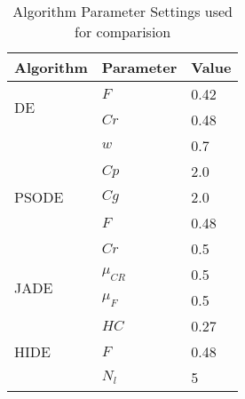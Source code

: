 

\begin{table}[b]
\centering
\caption{Algorithm Parameter Settings used for comparision}
\label{}
\begin{tabular}{|l|l|l|}
\hline
Algorithm & Parameter & Value \\
\hline
\multirow{2}{*}{DE} & $F$ & 0.42 \\ \cline{2-3} 
                  & $Cr$ & 0.48 \\ \hline
\multirow{5}{*}{PSODE} & $w$ & 0.7 \\ \cline{2-3} 
                  & $Cp$ & 2.0 \\ \cline{2-3} 
                  & $Cg$ & 2.0 \\ \cline{2-3} 
                  & $F$ & 0.48 \\ \cline{2-3} 
                  & $Cr$ & 0.5 \\ \hline
\multirow{2}{*}{JADE} & $\mu_{CR}$ & 0.5 \\ \cline{2-3} 
                  & $\mu_{F}$ & 0.5 \\ \hline
\multirow{3}{*}{HIDE} & $HC$ & 0.27 \\ \cline{2-3}
				& $F$ & 0.48 \\ \cline{2-3}
                  & $N_{l}$ & 5 \\ \hline
\end{tabular}
\end{table}
